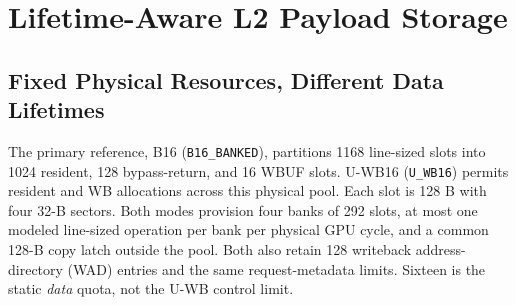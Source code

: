 \documentclass[conference,letterpaper]{IEEEtran}
\newcommand{\base}{B16}
\newcommand{\unif}{U-WB16}
\begin{document}
\section{Lifetime-Aware L2 Payload Storage}
\subsection{Fixed Physical Resources, Different Data Lifetimes}
The primary reference, \base{} (\texttt{B16\_BANKED}), partitions 1168 line-sized slots into 1024 resident, 128 bypass-return, and 16 WBUF slots. \unif{} (\texttt{U\_WB16}) permits resident and WB allocations across this physical pool. Each slot is 128 B with four 32-B sectors. Both modes provision four banks of 292 slots, at most one modeled line-sized operation per bank per physical GPU cycle, and a common 128-B copy latch outside the pool. Both also retain 128 writeback address-directory (WAD) entries and the same request-metadata limits. Sixteen is the static \emph{data} quota, not the U-WB control limit.
\end{document}
